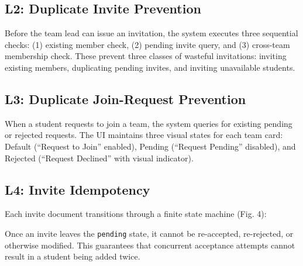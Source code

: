 \documentclass[12pt,a4paper]{article}
\begin{document}
\subsection{L2: Duplicate Invite Prevention}

Before the team lead can issue an invitation, the system executes three sequential checks: (1) existing member check, (2) pending invite query, and (3) cross-team membership check. These prevent three classes of wasteful invitations: inviting existing members, duplicating pending invites, and inviting unavailable students.

\subsection{L3: Duplicate Join-Request Prevention}

When a student requests to join a team, the system queries for existing pending or rejected requests. The UI maintains three visual states for each team card: Default (``Request to Join'' enabled), Pending (``Request Pending'' disabled), and Rejected (``Request Declined'' with visual indicator).

\subsection{L4: Invite Idempotency}

Each invite document transitions through a finite state machine (Fig. 4):

\begin{figure}[H]
\centering
{}
\end{figure}

Once an invite leaves the \texttt{pending} state, it cannot be re-accepted, re-rejected, or otherwise modified. This guarantees that concurrent acceptance attempts cannot result in a student being added twice.
\end{document}

